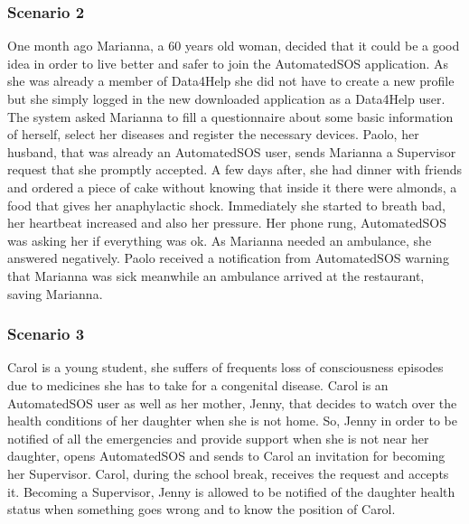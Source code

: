 {\color{Blue}\subsubsection{Scenario 2}}
One month ago Marianna, a 60 years old woman, decided  that  it  could  be  a  good  idea  in  order  to  live  better  and  safer to join the AutomatedSOS application.  As she was already a member of Data4Help she did not have to create a new profile but she simply logged in the new downloaded application as a Data4Help user. The system asked Marianna to  fill  a  questionnaire  about  some  basic  information  of  herself, select her diseases and register the necessary devices. Paolo, her husband, that was already an AutomatedSOS user, sends Marianna a Supervisor request that she promptly accepted. A  few  days  after,  she  had  dinner  with  friends  and  ordered  a  piece  of  cake  without  knowing  that  inside  it  there  were  almonds,  a  food  that  gives  her  anaphylactic  shock.  Immediately  she  started  to  breath  bad,  her  heartbeat  increased  and  also  her  pressure.  Her  phone  rung,  AutomatedSOS  was  asking her if  everything  was  ok.  As  Marianna  needed  an  ambulance,  she  answered  negatively.  Paolo received a notification from AutomatedSOS warning that Marianna was sick meanwhile an ambulance arrived at the restaurant, saving Marianna.   


{\color{Blue}\subsubsection{Scenario 3}}
Carol is a young student, she suffers of frequents loss of consciousness episodes due to medicines she has to take for a congenital disease. Carol is an AutomatedSOS user as well as her mother, Jenny, that decides to watch over the health conditions of her daughter when she is not home. So, Jenny in order to be notified of all the emergencies and provide support when she is not near her daughter, opens AutomatedSOS and sends to Carol an invitation for becoming her Supervisor. Carol, during the school break, receives the request and accepts it. Becoming a Supervisor, Jenny is allowed to be notified of the daughter health status when something goes wrong and to know the position of Carol.


